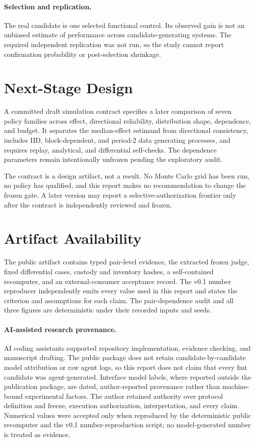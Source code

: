 \documentclass[10pt]{article}
\begin{document}
\paragraph{Selection and replication.}
The real candidate is one selected functional control.  Its observed gain is
not an unbiased estimate of performance across candidate-generating systems.
The required independent replication was not run, so the study cannot report
confirmation probability or post-selection shrinkage.

\section{Next-Stage Design}

A committed draft simulation contract specifies a later comparison of seven
policy families across effect, directional reliability, distribution shape,
dependence, and budget.  It separates the median-effect estimand from
directional consistency, includes IID, block-dependent, and period-2 data
generating processes, and requires replay, analytical, and differential
self-checks.  The dependence parameters remain intentionally unfrozen pending
the exploratory audit.

The contract is a design artifact, not a result.  No Monte Carlo grid has been
run, no policy has qualified, and this report makes no recommendation to change
the frozen gate.  A later version may report a selective-authorization frontier
only after the contract is independently reviewed and frozen.

\section{Artifact Availability}

The public artifact contains typed pair-level evidence, the extracted frozen
judge, fixed differential cases, custody and inventory hashes, a self-contained
recomputer, and an external-consumer acceptance record.  The v0.1 number
reproducer independently emits every value used in this report and states the
criterion and assumptions for each claim.  The pair-dependence audit and all
three figures are deterministic under their recorded inputs and seeds.

\paragraph{AI-assisted research provenance.}
AI coding assistants supported repository implementation, evidence checking,
and manuscript drafting.  The public package does not retain
candidate-by-candidate model attribution or raw agent logs, so this report
does not claim
that every fmt candidate was agent-generated.  Interface model labels, where
reported outside the publication package, are dated, author-reported provenance
rather than machine-bound experimental factors.  The author retained authority
over protocol definition and freeze, execution authorization, interpretation,
and every claim.  Numerical values were accepted only when reproduced by the
deterministic public recomputer and the v0.1 number-reproduction script; no
model-generated number is treated as evidence.
\end{document}
